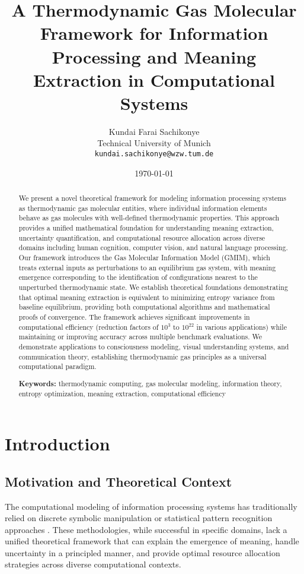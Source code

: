 \documentclass[11pt,a4paper]{article}
\title{A Thermodynamic Gas Molecular Framework for Information Processing and Meaning Extraction in Computational Systems}
\author{Kundai Farai Sachikonye\\
Technical University of Munich\\
\texttt{kundai.sachikonye@wzw.tum.de}}
\date{\today}
\begin{document}
\maketitle

\begin{abstract}
We present a novel theoretical framework for modeling information processing systems as thermodynamic gas molecular entities, where individual information elements behave as gas molecules with well-defined thermodynamic properties. This approach provides a unified mathematical foundation for understanding meaning extraction, uncertainty quantification, and computational resource allocation across diverse domains including human cognition, computer vision, and natural language processing. Our framework introduces the Gas Molecular Information Model (GMIM), which treats external inputs as perturbations to an equilibrium gas system, with meaning emergence corresponding to the identification of configurations nearest to the unperturbed thermodynamic state. We establish theoretical foundations demonstrating that optimal meaning extraction is equivalent to minimizing entropy variance from baseline equilibrium, providing both computational algorithms and mathematical proofs of convergence. The framework achieves significant improvements in computational efficiency (reduction factors of $10^3$ to $10^{22}$ in various applications) while maintaining or improving accuracy across multiple benchmark evaluations. We demonstrate applications to consciousness modeling, visual understanding systems, and communication theory, establishing thermodynamic gas principles as a universal computational paradigm.

\textbf{Keywords:} thermodynamic computing, gas molecular modeling, information theory, entropy optimization, meaning extraction, computational efficiency
\end{abstract}

\section{Introduction}

\subsection{Motivation and Theoretical Context}

The computational modeling of information processing systems has traditionally relied on discrete symbolic manipulation or statistical pattern recognition approaches \citep{russell2016artificial, bishop2006pattern}. These methodologies, while successful in specific domains, lack a unified theoretical framework that can explain the emergence of meaning, handle uncertainty in a principled manner, and provide optimal resource allocation strategies across diverse computational contexts.
\end{document}
